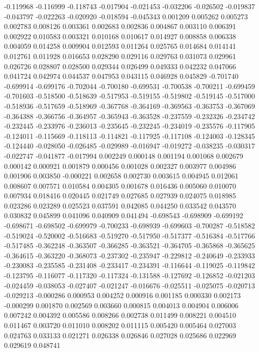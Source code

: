 -0.119968
-0.116999
-0.118743
-0.017904
-0.021453
-0.032206
-0.026502
-0.019837
-0.043797
-0.022263
-0.020920
-0.018594
-0.045343
0.001209
0.005262
0.005273
0.002783
0.008126
0.003361
0.002683
0.002836
0.004867
0.003110
0.006391
0.002922
0.010583
0.003321
0.010168
0.010617
0.014927
0.008858
0.006338
0.004059
0.014258
0.009904
0.012593
0.011264
0.025765
0.014684
0.014141
0.012761
0.011928
0.016653
0.028290
0.029116
0.029763
0.031073
0.029961
0.026726
0.028807
0.028500
0.029344
0.026499
0.049333
0.042232
0.047066
0.041724
0.042974
0.044537
0.047953
0.043115
0.046928
0.045829
-0.701740
-0.699914
-0.699176
-0.702044
-0.700180
-0.699531
-0.700538
-0.700211
-0.699459
-0.701603
-0.518500
-0.518639
-0.517953
-0.519155
-0.519802
-0.519145
-0.517000
-0.518936
-0.517659
-0.518969
-0.367768
-0.364169
-0.369563
-0.363753
-0.367069
-0.364388
-0.366756
-0.364957
-0.365943
-0.363528
-0.237559
-0.232326
-0.234742
-0.232445
-0.233976
-0.236013
-0.235645
-0.232245
-0.234019
-0.235576
-0.117905
-0.124011
-0.115669
-0.118113
-0.114821
-0.117925
-0.117108
-0.124003
-0.128345
-0.124440
-0.028050
-0.026485
-0.029989
-0.016947
-0.019272
-0.038235
-0.030317
-0.022747
-0.041877
-0.017994
0.002249
0.000148
0.001194
0.001068
0.002679
0.000142
0.000921
0.001879
0.000456
0.001028
0.002327
0.003977
0.004986
0.001906
0.003850
-0.000221
0.002658
0.002730
0.003615
0.004945
0.012061
0.008607
0.007571
0.010584
0.004305
0.001678
0.016436
0.005060
0.010070
0.007934
0.018416
0.020445
0.021749
0.027685
0.027939
0.024075
0.018985
0.023286
0.023289
0.025523
0.037591
0.042085
0.044250
0.033542
0.043570
0.030832
0.045899
0.041096
0.040909
0.041494
-0.698543
-0.698909
-0.699192
-0.698671
-0.698502
-0.699979
-0.700233
-0.698939
-0.699603
-0.700287
-0.518582
-0.519024
-0.520002
-0.516683
-0.519270
-0.517950
-0.517377
-0.516384
-0.517766
-0.517485
-0.362248
-0.363507
-0.366285
-0.363521
-0.364705
-0.365868
-0.365625
-0.364615
-0.363220
-0.368073
-0.237302
-0.235947
-0.229812
-0.240649
-0.233933
-0.230083
-0.235585
-0.231408
-0.233417
-0.234391
-0.116644
-0.119025
-0.119842
-0.123795
-0.116077
-0.117320
-0.117324
-0.131588
-0.127692
-0.126852
-0.021203
-0.024459
-0.038053
-0.027407
-0.021247
-0.016676
-0.025511
-0.025075
-0.020713
-0.029213
-0.000286
0.000953
0.004252
0.000916
0.001185
0.000330
0.002173
-0.000299
0.001870
0.002569
0.003660
0.000815
0.004013
0.004904
0.006006
0.007242
0.004392
0.005586
0.008266
0.002738
0.011499
0.008221
0.004510
0.011467
0.003720
0.011010
0.008202
0.011115
0.005420
0.005464
0.027003
0.024763
0.033133
0.021271
0.026338
0.026846
0.027028
0.025686
0.022969
0.029619
0.048741
